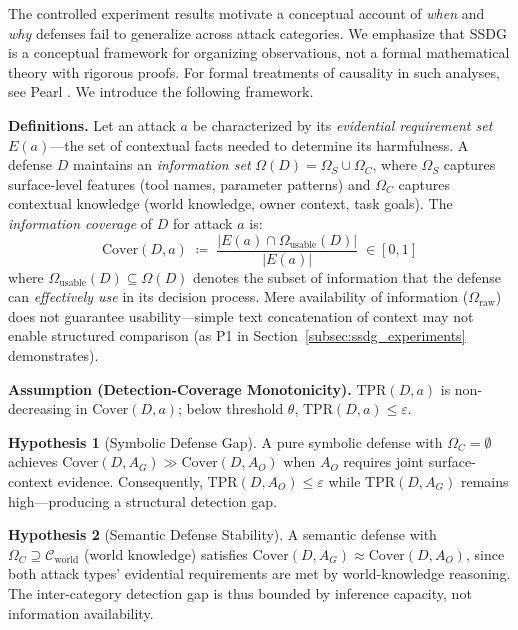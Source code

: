 \documentclass[conference]{IEEEtran}
\theoremstyle{definition}
\newtheorem{hypothesis}{Hypothesis}
\begin{document}
The controlled experiment results motivate a conceptual account of
\emph{when} and \emph{why} defenses fail to generalize across attack
categories. We emphasize that SSDG is a conceptual framework for organizing observations, not a formal mathematical theory with rigorous proofs. For formal treatments of causality in such analyses, see Pearl \cite{pearl2009causality}. We introduce the following framework.

\textbf{Definitions.} Let an attack $a$ be characterized by its
\emph{evidential requirement set} $E(a)$---the set of contextual facts
needed to determine its harmfulness. A defense $D$ maintains an
\emph{information set} $\Omega(D) = \Omega_S \cup \Omega_C$, where
$\Omega_S$ captures surface-level features (tool names, parameter
patterns) and $\Omega_C$ captures contextual knowledge (world knowledge,
owner context, task goals). The \emph{information coverage} of $D$ for
attack $a$ is:
\[
  \mathrm{Cover}(D,a) \;\coloneqq\; \frac{|E(a) \cap \Omega_{\mathrm{usable}}(D)|}{|E(a)|}
  \;\in [0,1]
\]
where $\Omega_{\mathrm{usable}}(D) \subseteq \Omega(D)$ denotes the subset of
information that the defense can \emph{effectively use} in its decision
process. Mere availability of information ($\Omega_{\mathrm{raw}}$) does not
guarantee usability---simple text concatenation of context may not enable
structured comparison (as P1 in Section~\ref{subsec:ssdg_experiments}
demonstrates).

\textbf{Assumption (Detection-Coverage Monotonicity).}
$\mathrm{TPR}(D,a)$ is non-decreasing in $\mathrm{Cover}(D,a)$; below
threshold $\theta$, $\mathrm{TPR}(D,a) \leq \varepsilon$.

\begin{hypothesis}[Symbolic Defense Gap]
\label{hyp:symbolic_gap}
A pure symbolic defense with $\Omega_C = \emptyset$ achieves
$\mathrm{Cover}(D, A_G) \gg \mathrm{Cover}(D, A_O)$ when $A_O$ requires
joint surface-context evidence. Consequently, $\mathrm{TPR}(D, A_O)
\leq \varepsilon$ while $\mathrm{TPR}(D, A_G)$ remains high---producing
a structural detection gap.
\end{hypothesis}

\begin{hypothesis}[Semantic Defense Stability]
\label{hyp:semantic_stability}
A semantic defense with $\Omega_C \supseteq \mathcal{C}_{\mathrm{world}}$
(world knowledge) satisfies $\mathrm{Cover}(D, A_G) \approx
\mathrm{Cover}(D, A_O)$, since both attack types' evidential requirements
are met by world-knowledge reasoning. The inter-category detection gap
is thus bounded by inference capacity, not information availability.
\end{hypothesis}
\end{document}
